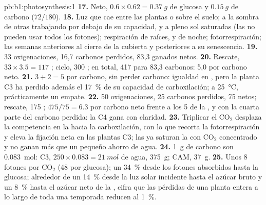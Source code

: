 \begin{solution}{pb:b1:photosynthesis:1}
\textbf{17.} Neto, $0.6\times 0.62 = \qty{0.37}{g}$ de glucosa y
$\qty{0.15}{g}$ de carbono ($72/180$).
\textbf{18.} Luz que cae entre las plantas o sobre el suelo;  a la
sombra de otras  trabajando por debajo de su capacidad, y  a pleno
sol saturadas (las  no pueden usar todos los fotones); respiración de
raíces,  y de noche; fotorrespiración; las semanas anteriores al
cierre de la cubierta y posteriores a su senescencia.
\textbf{19.} 33 oxigenaciones, 16,7 carbonos perdidos, 83,3 ganados netos.
\textbf{20.} Rescate, $33\times 3.5 = 117$ ; ciclo, 300 ; en total,
417  para 83,3 carbonos: 5,0  por carbono neto.
\textbf{21.} $3 + 2 = 5$  por carbono, sin perder carbono: igualdad en
, pero la planta C3 ha perdido además el \qty{17}{\%} de su capacidad de
carboxilación; a \qty{25}{\celsius}, prácticamente un empate.
\textbf{22.} 50 oxigenaciones, 25 carbonos perdidos, 75 netos; rescate, 175
; $475/75 = 6.3$  por carbono neto frente a los 5 de la , y
con la cuarta parte del carbono perdida: la C4 gana con claridad.
\textbf{23.} Triplicar el $\mathrm{CO_2}$ desplaza la competencia en la
 hacia la carboxilación, con lo que recorta la fotorrespiración y
eleva la fijación neta en las plantas C3; las  ya saturan la
 con $\mathrm{CO_2}$ concentrado y no ganan más que un pequeño ahorro
de agua.
\textbf{24.} \qty{1}{g} de carbono son \qty{0.083}{mol}: C3, $250\times 0.083 = \qty{21}{mol}$ de agua, \qty{375}{g}; CAM, \qty{37}{g}.
\textbf{25.} Unos 8 fotones por $\mathrm{CO_2}$ (48 por glucosa); un
\qty{34}{\%} desde los fotones absorbidos hasta la glucosa; alrededor de un
\qty{14}{\%} desde la luz solar incidente hasta el azúcar bruto y un
\qty{8}{\%} hasta el azúcar neto de la , cifra que las pérdidas de una
planta entera a lo largo de toda una temporada reducen al \qty{1}{\%}.
\end{solution}

